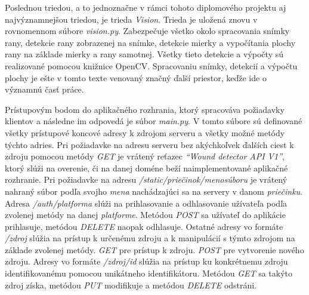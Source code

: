 Poslednou triedou, a to jednoznačne v rámci tohoto diplomového projektu aj najvýznamnejšou triedou, je trieda \textit{Vision}. Trieda je uložená znovu v rovnomennom súbore \textit{vision.py}. Zabezpečuje všetko okolo spracovania snímky rany, detekcie rany zobrazenej na snímke, detekcie mierky a vypočítania plochy rany na základe mierky a rany samotnej. Všetky tieto detekcie a výpočty sú realizované pomocou knižnice OpenCV. Spracovaniu snímky, detekcií a výpočtu plochy je ešte v tomto texte venovaný značný ďalší priestor, keďže ide o významnú časť práce.

Prístupovým bodom do aplikačného rozhrania, ktorý spracováva požiadavky klientov a následne im odpovedá je súbor \textit{main.py}. V tomto súbore sú definované všetky prístupové koncové adresy k zdrojom serveru a všetky možné metódy týchto adries. Pri požiadavke na adresu serveru bez akýchkoľvek ďalších ciest k zdroju pomocou metódy \textit{GET}  je vrátený reťazec \textit{“Wound detector API V1”}, ktorý slúži na overenie, či na danej doméne beží naimplementované aplikačné rozhranie. Pri požiadavke na adresu \textit{/static/priečinok/menosúboru} je vrátený nahraný súbor podľa svojho \textit{mena} nachádzajúci sa na servery v danom \textit{priečinku}. Adresa \textit{/auth/platforma} slúži na prihlasovanie a odhlasovanie užívateľa podľa zvolenej metódy na danej \textit{platforme}. Metódou \textit{POST} sa užívateľ do aplikácie prihlasuje, metódou \textit{DELETE} naopak odhlasuje. Ostatné adresy vo formáte \textit{/zdroj} slúžia na prístup k určenému zdroju a k manipulácií s týmto zdrojom na základe zvolenej metódy. \textit{GET} pre prístup k zdroju. \textit{POST} pre vytvorenie nového zdroju. Adresy vo formáte \textit{/zdroj/id} slúžia na prístup ku konkrétnemu zdroju identifikovanému pomocou unikátneho identifikátoru. Metódou \textit{GET} sa takýto zdroj získa, metódou \textit{PUT} modifikuje a metódou \textit{DELETE} odstráni. 


